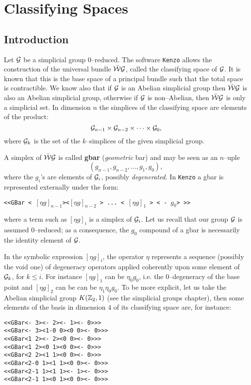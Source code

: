 \chapter {Classifying Spaces}

\section {Introduction}

Let ${\cal G}$ be a simplicial group $0$--reduced. The software  {\tt Kenzo} allows
the construction of the universal bundle $\bar{\cal W}{\cal G}$, called the
classifying space of ${\cal G}$.
It is known that this is the base space of  a principal bundle
such that the total space is contractible. We know also that if ${\cal G}$ is
an Abelian simplicial group then $\bar{\cal W}{\cal G}$ is also an Abelian
simplicial group, otherwise if ${\cal G}$ is non--Abelian, then $\bar{\cal W}{\cal G}$
is only a simplicial set. In dimension $n$ the simplices of the
classifying space are elements of the  product:
$${\cal G}_{n-1}\times {\cal G}_{n-2}\times\cdots\times{\cal G}_0,$$
where ${\cal G}_k$ is the set of the $k$--simplices of the given simplicial group. \par
A simplex of $\bar{\cal W}{\cal G}$ is called {\bf gbar} ({\em geometric} bar)
and  may be seen as an $n$--uple
$$(g_{n-1}, g_{n-2}, \ldots, g_1, g_0),$$
where the $g_i$'s are elements of ${\cal G}_i$, possibly {\em degenerated}.
In {\tt Kenzo} a gbar is represented externally under the form:
\begin{center}
{\tt <<GBar < $[\eta g]_{n-1}$><$[\eta g]_{n-2}$ > ...  < $[\eta g]_1$ > < - $g_0$> >>}
\end{center}
where  a term such as $[\eta g]_i$ is a simplex of ${\cal G}_i$. Let us recall that
our group ${\cal G}$ is assumed $0$--reduced; as a consequence, the $g_0$ compound
of a gbar is necessarily the identity element of ${\cal G}$. \par
In the  symbolic expression $[\eta g]_i$,  the operator
$\eta$ represents a sequence (possibly the void one) of degeneracy operators
applied coherently upon some element of ${\cal G}_k$, for $k\leq i$. For instance $[\eta g]_1$
can be $\eta_0 g_0$, i.e. the $0$--degeneracy of the base point and $[\eta g]_2$ can be
can be $\eta_1\eta_0 g_0$. To be more explicit, let us take the Abelian simplicial group
$K({\mathbb{Z}}_2, 1)$ (see the simplicial groups chapter), then some elements of the basis in dimension $4$ of
its classifying space are, for instance:
{\footnotesize\begin{verbatim}
<<GBar<- 3><- 2><- 1><- 0>>>
<<GBar<- 3><1-0 0><0 0><- 0>>>
<<GBar<1 2><- 2><0 0><- 0>>>
<<GBar<1 2><0 1><0 0><- 0>>>
<<GBar<2 2><1 1><0 0><- 0>>>
<<GBar<2-0 1><1 1><0 0><- 0>>>
<<GBar<2-1 1><1 1><- 1><- 0>>>
<<GBar<2-1 1><0 1><0 0><- 0>>>
\end{verbatim}}


